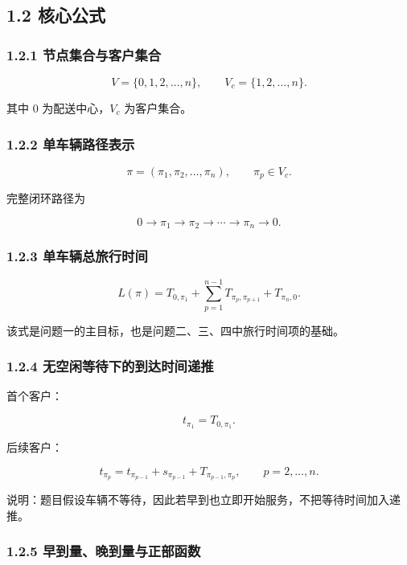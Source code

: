 \documentclass[
  a4paper,
]{ctexart}
\begin{document}
\subsection{1.2 核心公式}\label{ux6838ux5fc3ux516cux5f0f}

\subsubsection{1.2.1
节点集合与客户集合}\label{ux8282ux70b9ux96c6ux5408ux4e0eux5ba2ux6237ux96c6ux5408}

\[
V=\{0,1,2,\ldots,n\},\qquad V_c=\{1,2,\ldots,n\}.
\]

其中 \(0\) 为配送中心，\(V_c\) 为客户集合。

\subsubsection{1.2.2
单车辆路径表示}\label{ux5355ux8f66ux8f86ux8defux5f84ux8868ux793a}

\[
\pi=(\pi_1,\pi_2,\ldots,\pi_n),\qquad \pi_p\in V_c.
\]

完整闭环路径为

\[
0\to \pi_1\to \pi_2\to\cdots\to \pi_n\to 0.
\]

\subsubsection{1.2.3
单车辆总旅行时间}\label{ux5355ux8f66ux8f86ux603bux65c5ux884cux65f6ux95f4}

\[
L(\pi)=T_{0,\pi_1}+\sum_{p=1}^{n-1}T_{\pi_p,\pi_{p+1}}+T_{\pi_n,0}.
\]

该式是问题一的主目标，也是问题二、三、四中旅行时间项的基础。

\subsubsection{1.2.4
无空闲等待下的到达时间递推}\label{ux65e0ux7a7aux95f2ux7b49ux5f85ux4e0bux7684ux5230ux8fbeux65f6ux95f4ux9012ux63a8}

首个客户：

\[
t_{\pi_1}=T_{0,\pi_1}.
\]

后续客户：

\[
t_{\pi_p}=t_{\pi_{p-1}}+s_{\pi_{p-1}}+T_{\pi_{p-1},\pi_p},\qquad p=2,\ldots,n.
\]

说明：题目假设车辆不等待，因此若早到也立即开始服务，不把等待时间加入递推。

\subsubsection{1.2.5
早到量、晚到量与正部函数}\label{ux65e9ux5230ux91cfux665aux5230ux91cfux4e0eux6b63ux90e8ux51fdux6570}
\end{document}
